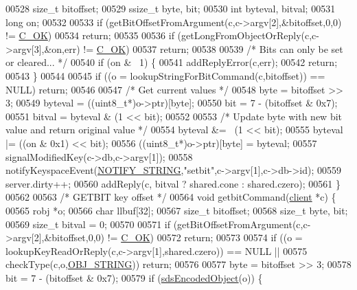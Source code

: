 \begin{DoxyCode}
{00528     size\_t bitoffset;
00529     ssize\_t byte, bit;
00530     \textcolor{keywordtype}{int} byteval, bitval;
00531     \textcolor{keywordtype}{long} on;
00532 
00533     \textcolor{keywordflow}{if} (getBitOffsetFromArgument(c,c->argv[2],&bitoffset,0,0) != \hyperlink{server_8h_a303769ef1065076e68731584e758d3e1}{C\_OK})
00534         \textcolor{keywordflow}{return};
00535 
00536     \textcolor{keywordflow}{if} (getLongFromObjectOrReply(c,c->argv[3],&on,err) != \hyperlink{server_8h_a303769ef1065076e68731584e758d3e1}{C\_OK})
00537         \textcolor{keywordflow}{return};
00538 
00539     \textcolor{comment}{/* Bits can only be set or cleared... */}
00540     \textcolor{keywordflow}{if} (on & ~1) \{
00541         addReplyError(c,err);
00542         \textcolor{keywordflow}{return};
00543     \}
00544 
00545     \textcolor{keywordflow}{if} ((o = lookupStringForBitCommand(c,bitoffset)) == NULL) \textcolor{keywordflow}{return};
00546 
00547     \textcolor{comment}{/* Get current values */}
00548     byte = bitoffset >> 3;
00549     byteval = ((uint8\_t*)o->ptr)[byte];
00550     bit = 7 - (bitoffset & 0x7);
00551     bitval = byteval & (1 << bit);
00552 
00553     \textcolor{comment}{/* Update byte with new bit value and return original value */}
00554     byteval &= ~(1 << bit);
00555     byteval |= ((on & 0x1) << bit);
00556     ((uint8\_t*)o->ptr)[byte] = byteval;
00557     signalModifiedKey(c->db,c->argv[1]);
00558     notifyKeyspaceEvent(\hyperlink{server_8h_a1902292b73b71baa65d86db2d61b47ce}{NOTIFY\_STRING},\textcolor{stringliteral}{"setbit"},c->argv[1],c->db->id);
00559     server.dirty++;
00560     addReply(c, bitval ? shared.cone : shared.czero);
00561 \}
00562 
00563 \textcolor{comment}{/* GETBIT key offset */}
00564 \textcolor{keywordtype}{void} getbitCommand(\hyperlink{structclient}{client} *c) \{
00565     robj *o;
00566     \textcolor{keywordtype}{char} llbuf[32];
00567     size\_t bitoffset;
00568     size\_t byte, bit;
00569     size\_t bitval = 0;
00570 
00571     \textcolor{keywordflow}{if} (getBitOffsetFromArgument(c,c->argv[2],&bitoffset,0,0) != \hyperlink{server_8h_a303769ef1065076e68731584e758d3e1}{C\_OK})
00572         \textcolor{keywordflow}{return};
00573 
00574     \textcolor{keywordflow}{if} ((o = lookupKeyReadOrReply(c,c->argv[1],shared.czero)) == NULL ||
00575         checkType(c,o,\hyperlink{server_8h_a65236ea160f69cdef33ec942092af88f}{OBJ\_STRING})) \textcolor{keywordflow}{return};
00576 
00577     byte = bitoffset >> 3;
00578     bit = 7 - (bitoffset & 0x7);
00579     \textcolor{keywordflow}{if} (\hyperlink{server_8h_afcfb5bd97af52d1dbce331745cae030c}{sdsEncodedObject}(o)) \{
}
\end{DoxyCode}
